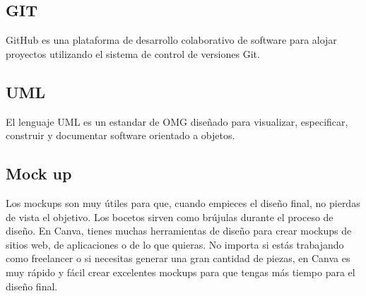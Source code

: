\subsection{GIT}
GitHub es una plataforma de desarrollo colaborativo de software para alojar proyectos utilizando el sistema de control de versiones Git.
\cite[git hub,(2018)]{referencia3}


\subsection{UML}
El lenguaje UML es un estandar de OMG diseñado para visualizar, especificar, construir y documentar software orientado a objetos.
\cite[Grady Booch. (2015) )]{referencia5}


\subsection{Mock up}
Los mockups son muy útiles para que, cuando empieces el diseño final, no pierdas de vista el objetivo. Los bocetos sirven como brújulas durante el proceso de diseño. En Canva, tienes muchas herramientas de diseño para crear mockups de sitios web, de aplicaciones o de lo que quieras. No importa si estás trabajando como freelancer o si necesitas generar una gran cantidad de piezas, en Canva es muy rápido y fácil crear excelentes mockups para que tengas más tiempo para el diseño final.
\cite[canva. (2018)]{referencia4}
